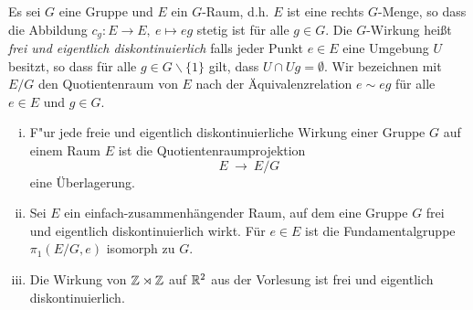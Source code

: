 \begin{aufgabe}
	Es sei $G$ eine Gruppe und $E$ ein $G$-Raum, d.h. $E$ ist eine rechts $G$-Menge, so dass die Abbildung $c_g\colon E\to E,\ e\mapsto eg$ stetig ist für alle $g\in G$. Die $G$-Wirkung heißt \emph{frei und eigentlich diskontinuierlich}
	falls jeder Punkt $e\in E$ eine Umgebung $U$ besitzt, so dass
	für alle $g\in G\backslash\{1\}$ gilt, dass $U\cap Ug=\emptyset$.
	Wir bezeichnen mit $E/G$ den Quotientenraum von $E$ nach
	der Äquivalenzrelation $e\sim eg$ für alle $e\in E$ und $g\in G$.	
	\begin{enumerate}[i)]
		\item F"ur jede freie und eigentlich diskontinuierliche Wirkung
		einer Gruppe $G$ auf einem Raum $E$ ist die Quotientenraumprojektion
		\[ E \ \to \ E/G \]
		eine Überlagerung. %
		\item Sei $E$ ein einfach-zusammenhängender Raum, auf dem eine Gruppe $G$ frei und eigentlich diskontinuierlich wirkt. Für $e\in E$ ist die Fundamentalgruppe $\pi_1(E/G, e)$ isomorph zu $G$. 
		\item Die Wirkung von $\mathbb Z\rtimes \mathbb Z$ auf $\mathbb{R}^2$ aus der Vorlesung ist frei und eigentlich diskontinuierlich.
	\end{enumerate}
\end{aufgabe}

